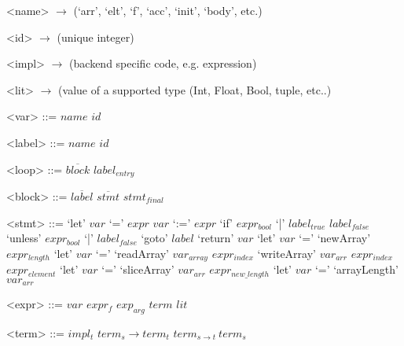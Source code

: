 \documentclass[preamble.tex]{subfiles}
\begin{document}

\setlength{\grammarindent}{5em} %
\renewcommand{\syntleft}{\normalfont\itshape} %
\renewcommand{\syntright}{}
\renewcommand{\litleft}{\ttfamily} %
\renewcommand{\litright}{}
\newcommand{\many}{\overline} %


\setlength{\grammarparsep}{0pt} %

\begin{grammar}
<name> $\rightarrow$ (`arr', `elt', `f', `acc', `init', `body', etc.)

<id>   $\rightarrow$ (unique integer\footnotemark)

<impl> $\rightarrow$ (backend specific code, e.g.  expression)

<lit>  $\rightarrow$ (\Haskell value of a supported type (Int, Float, Bool, tuple, etc..)

<var>  ::= $name$ $id$

<label> ::= $name$ $id$

\end{grammar}

\setlength{\grammarparsep}{10pt plus 1pt minus 1pt} %
\begin{grammar}
<loop> ::= $\many{block}$ $label_{entry}$

<block> ::= $\many{label}$ $\many{stmt}$ $stmt_{final}$

<stmt> ::= `let' $var$ `=' $expr$
      \alt $var$ `:=' $expr$
      \alt `if' $expr_{bool}$ `|' $label_{true}$ $label_{false}$
      \alt `unless' $expr_{bool}$ `|' $label_{false}$
      \alt `goto' $label$
      \alt `return' $var$
      \alt `let' $var$ `=' `newArray' $expr_{length}$
      \alt `let' $var$ `=' `readArray' $var_{array}$ $expr_{index}$
      \alt `writeArray' $var_{arr}$ $expr_{index}$ $expr_{element}$
      \alt `let' $var$ `=' `sliceArray' $var_{arr}$ $expr_{new\_length}$
      \alt `let' $var$ `=' `arrayLength' $var_{arr}$

<expr> ::= $var$
      \alt $expr_{\mathit{f}}$ $exp_{arg}$
      \alt $term$
      \alt $lit$

<term> ::= $impl_{t}$
      \alt $term_{s} \rightarrow term_{t}$
      \alt $term_{s \rightarrow t}\ term_{s}$

\end{grammar}
\end{document}
